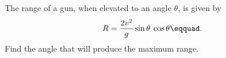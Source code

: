 The range of a gun, when elevated to an angle $\theta$, is given by
\begin{align*}
  R=\frac{2v^2}{g}\sin\theta\:\cos\theta\eqquad.
\end{align*}
Find the angle that will produce the maximum range.
